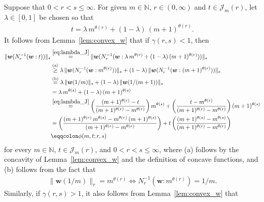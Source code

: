 \documentclass[conference, draftcls, onecolumn]{IEEEtran}
\theoremstyle{plain}
\newcommand{\bvec}[1]{\boldsymbol{#1}}
\newcommand{\lemref}[1]{Lemma~\ref{#1}}
\newcommand{\thref}[1]{Theorem~\ref{#1}}
\begin{document}
\begin{IEEEproof}[Proof of \thref{th:UV}]
Suppose that $0 < r < s \le \infty$.
For given $m \in \mathbb{N}$, $r \in (0, \infty)$ and $t \in \mathcal{J}_{m}( r )$, let $\lambda \in [0, 1]$ be chosen so that
\begin{align}
t
=
\lambda \, m^{\theta( r )} + (1-\lambda) \, (m+1)^{\theta( r )} .
\label{eq:lambda_J}
\end{align}
It follows from \lemref{lem:convex_w} that if $\gamma( r, s ) < 1$, then
\begin{align}
\| \bvec{w}( N_{r}^{-1}( \bvec{w} : t ) ) \|_{s}
& \overset{\eqref{eq:lambda_J}}{=}
\| \bvec{w}( N_{r}^{-1}( \bvec{w} : \lambda \, m^{\theta( r )} + (1-\lambda) \, (m+1)^{\theta( r )} ) ) \|_{s}
\\
& \overset{\text{(a)}}{\ge}
\lambda \, \| \bvec{w}( N_{r}^{-1}( \bvec{w} : m^{\theta( r )} ) ) \|_{s} + (1-\lambda) \, \| \bvec{w}( N_{r}^{-1}( \bvec{w} : (m+1)^{\theta( r )} ) ) \|_{s}
\\
& \overset{\text{(b)}}{=}
\lambda \, \| \bvec{w}( 1/m ) \|_{s} + (1-\lambda) \, \| \bvec{w}( 1/(m+1) ) \|_{s}
\\
& =
\lambda \, m^{\theta( s )} + (1-\lambda) \, (m+1)^{\theta( s )}
\label{previous:phi} \\
& \overset{\eqref{eq:lambda_J}}{=}
\bigg( \frac{ (m+1)^{\theta( r )} - t }{ (m+1)^{\theta( r )} - m^{\theta( r )} } \bigg) \, m^{\theta( s )} + \bigg( \frac{ t - m^{\theta( r )} }{ (m+1)^{\theta( r )} - m^{\theta( r )} } \bigg) \, (m+1)^{\theta( s )}
\label{prev2:phi} \\
& =
\bigg( \frac{ (m+1)^{\theta( r )} \, m^{\theta( s )} - m^{\theta( r )} \, (m+1)^{\theta( s )} }{ (m+1)^{\theta( r )} - m^{\theta( r )} } \bigg) + t \, \bigg( \frac{ (m+1)^{\theta( s )} - m^{\theta( s )} }{ (m+1)^{\theta( r )} - m^{\theta( r )} } \bigg)
\label{prev3:phi} \\
& \eqqcolon
\phi(m, t; r, s)
\label{def:phi}
\end{align}
for every $m \in \mathbb{N}$, $t \in \mathcal{J}_{m}( r )$, and $0 < r < s \le \infty$, where (a) follows by the concavity of \lemref{lem:convex_w} and the definition of concave functions, and (b) follows from the fact that
\begin{align}
\| \bvec{w}( 1/m ) \|_{r}
=
m^{\theta( r )}
\iff
N_{r}^{-1}( \bvec{w} : m^{\theta( r )} )
=
1/m .
\end{align}
Similarly, if $\gamma(r, s) > 1$, it also follows from \lemref{lem:convex_w} that
\begin{align}

\end{align}
\end{IEEEproof}
\end{document}
